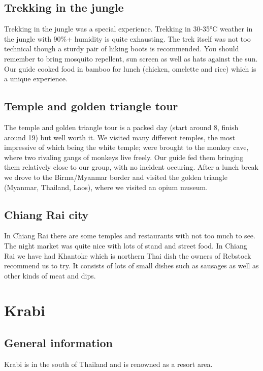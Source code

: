 \documentclass[11pt,a4paper,sans,english]{article}
\begin{document}
\subsection{Trekking in the jungle} 
Trekking in the jungle was a special experience. Trekking in 30-35°C weather in the jungle with 90\%+ humidity is quite exhausting. The trek itself was not too technical though a sturdy pair of hiking boots is recommended. You should remember to bring mosquito repellent, sun screen as well as hats against the sun. Our guide cooked food in bamboo for lunch (chicken, omelette and rice) which is a unique experience.
\subsection{Temple and golden triangle tour}
The temple and golden triangle tour is a packed day (start around 8, finish around 19) but well worth it. We visited many different temples, the most impressive of which being the white temple; were brought to the monkey cave, where two rivaling gangs of monkeys live freely. Our guide fed them bringing them relatively close to our group, with no incident occuring. After a lunch break we drove to the Birma/Myanmar border and visited the golden triangle (Myanmar, Thailand, Laos), where we visited an opium museum. 
\subsection{Chiang Rai city}
In Chiang Rai there are some temples and restaurants with not too much to see. The night market was quite nice with lots of stand and street food. In Chiang Rai we have had Khantoke which is northern Thai dish the owners of Rebstock recommend us to try. It consists of lots of small dishes such as sausages as well as other kinds of meat and dips. 
\section{Krabi}

\subsection{General information}
Krabi is in the south of Thailand and is renowned as a resort area. 
\end{document}

